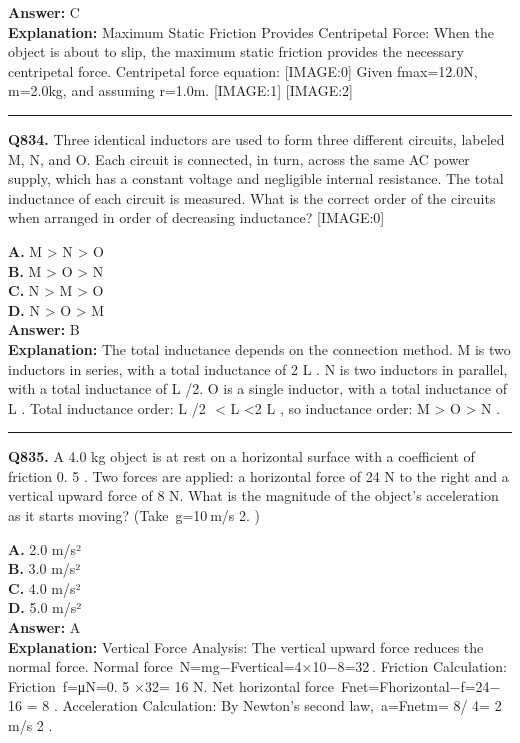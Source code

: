 \documentclass[12pt]{article}
\begin{document}
\textbf{Answer:} C \\
\textbf{Explanation:} Maximum Static Friction Provides Centripetal Force:
When the object is about to slip, the maximum static friction provides the necessary centripetal force. Centripetal force equation:
[IMAGE:0]
Given fmax​=12.0N, m=2.0kg, and assuming r=1.0m.
[IMAGE:1]
[IMAGE:2]

\hrule
\vspace{1em}


\noindent
\textbf{Q834.} Three identical inductors are used to form three different circuits, labeled M, N, and O. Each circuit is connected, in turn, across the same AC power supply, which has a constant voltage and negligible internal resistance. The total inductance of each circuit is measured. What is the correct order of the circuits when arranged in order of
decreasing
inductance?
[IMAGE:0]



\textbf{A.} M
>
N
>
O \\
\textbf{B.} M
>
O
>
N \\
\textbf{C.} N
>
M
>
O \\
\textbf{D.} N
>
O
>
M \\

\textbf{Answer:} B \\
\textbf{Explanation:} The total inductance depends on the connection method.
\cdot 
M is two inductors in series, with a total inductance of 2
L
.
\cdot 
N is two inductors in parallel, with a total inductance of
L
/2
​
.
\cdot 
O is a single inductor, with a total inductance of
L
.
Total inductance order:
L
/2
​
<
L
<2
L
, so inductance order:
M > O > N
.

\hrule
\vspace{1em}


\noindent
\textbf{Q835.} A 4.0 kg object is at rest on a horizontal surface with a coefficient of friction 0.
5
. Two forces are applied: a horizontal force of 24 N to the right and a vertical upward force of 8 N. What is the magnitude of the object’s acceleration as it starts moving? (Take g=10 m/s
2.
)



\textbf{A.} 2.0 m/s² \\
\textbf{B.} 3.0 m/s² \\
\textbf{C.} 4.0 m/s² \\
\textbf{D.} 5.0 m/s² \\

\textbf{Answer:} A \\
\textbf{Explanation:} Vertical Force Analysis: The vertical upward force reduces the normal force.
Normal force N=mg−Fvertical=4×10−8=32 .
Friction Calculation: Friction f=μN=0.
5
×32=
16
N.
Net horizontal force Fnet=Fhorizontal−f=24−
16
=
8
.
Acceleration Calculation: By Newton’s second law, a=Fnetm=
8/
4=
2
m/s
2
.
\end{document}
